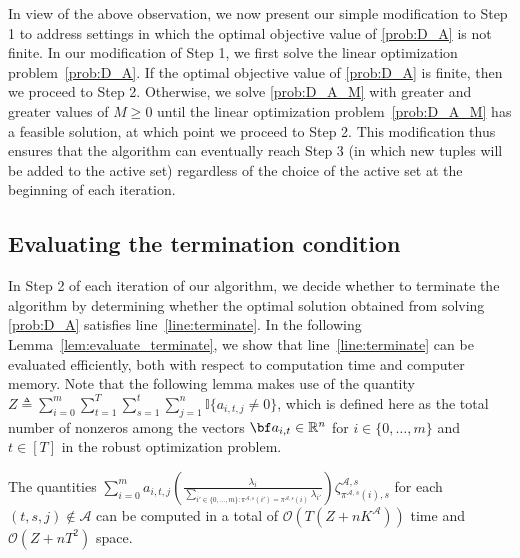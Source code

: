 \documentclass[nonblindrev,mnsc]{informs3} %
\newcommand{\ba}{{\bf a}}
\def\Real{\mathbb{R}}
\let\R\Real
\begin{document}
\begin{APPENDICES}
In view of the above observation, we now present our simple modification to Step 1 to address settings in which the optimal objective value of \eqref{prob:D_A} is not finite. In our modification of Step 1, we first solve the linear optimization problem~\eqref{prob:D_A}. If the optimal objective value of \eqref{prob:D_A} is finite, then we proceed to Step 2. Otherwise, we solve \eqref{prob:D_A_M} with greater and greater values of $M \ge 0$ until the linear optimization problem~\eqref{prob:D_A_M}  has a feasible solution, at which point we proceed to Step 2. This modification thus ensures that the algorithm can eventually reach Step 3 (in which new tuples will be added to the active set) regardless of the choice of the active set at the beginning of each iteration. 

\subsection{Evaluating the termination condition} \label{sec:evaluating_termination_condition} In Step 2 of each iteration of our algorithm, we decide whether to terminate the algorithm by determining whether the optimal solution obtained from solving \eqref{prob:D_A} satisfies line~\eqref{line:terminate}. In the following Lemma~\ref{lem:evaluate_terminate}, we show that line~\eqref{line:terminate} can be evaluated efficiently, both with respect to computation time and computer memory. Note that the following lemma makes use of the quantity $Z \triangleq \sum_{i=0}^m \sum_{t=1}^T \sum_{s=1}^t \sum_{j=1}^n \mathbb{I} \{ a_{i,t,j} \neq 0 \}$, which is defined here as the total number of nonzeros among the vectors $\ba_{i,t} \in \R^n$ for $i \in \{0,\ldots,m\}$ and $t \in [T]$ in the robust optimization problem. 
\begin{lemma} \label{lem:evaluate_terminate}
The quantities $\sum_{i=0}^m   a_{i,t,j} \left( \frac{\lambda_i}{\sum_{i' \in \{0,\ldots,m\}: \pi^{\mathcal{A},s}(i') = \pi^{\mathcal{A},s}(i)} \lambda_{i'}} \right) \zeta^{\mathcal{A},s}_{\pi^{\mathcal{A},s}(i),s}$  for each $(t,s,j) \notin \mathcal{A}$ can be computed in a total of $\mathcal{O}(T(Z + n K^{\mathcal{A}}))$ time and  $\mathcal{O}(Z + nT^2)$ space. 
\end{lemma}


\end{APPENDICES}
\end{document}

